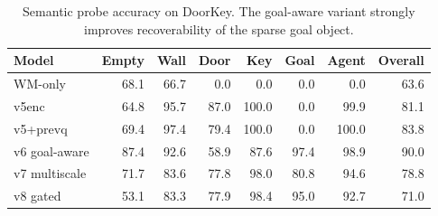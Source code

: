 \begin{table}[t]
\centering
\small
\begin{tabular}{lrrrrrrr}
\toprule
Model & Empty & Wall & Door & Key & Goal & Agent & Overall \\
\midrule
WM-only & 68.1 & 66.7 & 0.0 & 0.0 & 0.0 & 0.0 & 63.6 \\
v5enc & 64.8 & 95.7 & 87.0 & 100.0 & 0.0 & 99.9 & 81.1 \\
v5+prevq & 69.4 & 97.4 & 79.4 & 100.0 & 0.0 & 100.0 & 83.8 \\
v6 goal-aware & 87.4 & 92.6 & 58.9 & 87.6 & 97.4 & 98.9 & 90.0 \\
v7 multiscale & 71.7 & 83.6 & 77.8 & 98.0 & 80.8 & 94.6 & 78.8 \\
v8 gated & 53.1 & 83.3 & 77.9 & 98.4 & 95.0 & 92.7 & 71.0 \\
\bottomrule
\end{tabular}
\caption{Semantic probe accuracy on DoorKey. The goal-aware variant strongly improves recoverability of the sparse goal object.}
\label{tab:doorkey_probe}
\end{table}
